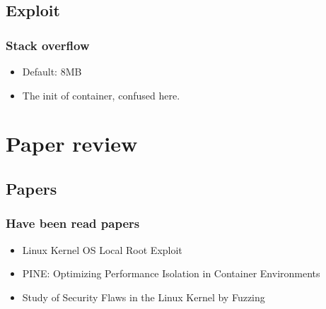 \documentclass{beamer}
\begin{document}
\subsection{Exploit}
\begin{frame}
    \frametitle{Stack overflow}
    \begin{itemize}
        \item Default: 8MB
        \item The init of container, confused here.
    \end{itemize}
    \cite{thread}
\end{frame}


\section{Paper review}
\subsection{Papers}
\begin{frame}
    \frametitle{Have been read papers}
    \begin{itemize}
        \item Linux Kernel OS Local Root Exploit\cite{root_exploit}
        \item PINE: Optimizing Performance Isolation in Container Environments\cite{Optimizing}
        \item Study of Security Flaws in the Linux Kernel by Fuzzing\cite{Fuzzing}
    \end{itemize}
\end{frame}
\end{document}
